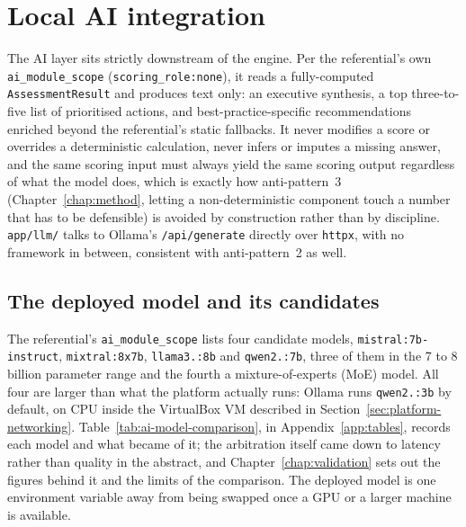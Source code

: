 \section{Local AI integration}
\label{sec:platform-local-ai}

The AI layer sits strictly downstream of the engine. Per the referential's own \texttt{ai\_\allowbreak module\_\allowbreak scope} (\texttt{scoring\_\allowbreak role:\allowbreak none}), it reads a fully-computed \texttt{Assessment\allowbreak Result} and produces text only: an executive synthesis, a top three-to-five list of prioritised actions, and best-practice-specific recommendations enriched beyond the referential's static fallbacks. It never modifies a score or overrides a deterministic calculation, never infers or imputes a missing answer, and the same scoring input must always yield the same scoring output regardless of what the model does, which is exactly how anti-pattern~3 (Chapter~\ref{chap:method}, letting a non-deterministic component touch a number that has to be defensible) is avoided by construction rather than by discipline. \texttt{app/\allowbreak llm/\allowbreak } talks to Ollama's \texttt{/\allowbreak api/\allowbreak generate} directly over \texttt{httpx}, with no framework in between, consistent with anti-pattern~2 as well.

\subsection{The deployed model and its candidates}

The referential's \texttt{ai\_\allowbreak module\_\allowbreak scope} lists four candidate models, \texttt{mistral:\allowbreak 7b-\allowbreak instruct}, \texttt{mixtral:\allowbreak 8x7b}, \texttt{llama3.:\allowbreak 8b} and \texttt{qwen2.:\allowbreak 7b}, three of them in the 7 to 8 billion parameter range and the fourth a mixture-of-experts (MoE) model. All four are larger than what the platform actually runs: Ollama runs \texttt{qwen2.:\allowbreak 3b} by default, on CPU inside the VirtualBox VM described in Section~\ref{sec:platform-networking}. Table~\ref{tab:ai-model-comparison}, in Appendix~\ref{app:tables}, records each model and what became of it; the arbitration itself came down to latency rather than quality in the abstract, and Chapter~\ref{chap:validation} sets out the figures behind it and the limits of the comparison. The deployed model is one environment variable away from being swapped once a GPU or a larger machine is available.

